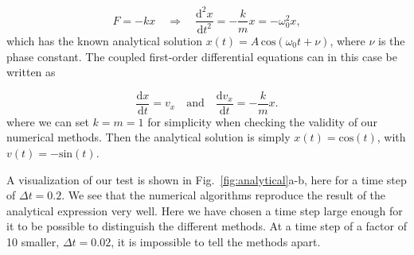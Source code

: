 \documentclass{article}
\begin{document}
\begin{multicols}{2}
\begin{equation}
	F = -kx \quad \Rightarrow \quad \frac{\mathrm{d}^2 x}{\mathrm{d}t^2} = - \frac{k}{m}x = - \omega_0^2 x,
\end{equation}
which has the known analytical solution $x(t) = A \, \mathrm{cos}(\omega_0 t + \nu)$, where $\nu$ is the phase constant. The coupled first-order differential equations can in this case be written as

\begin{equation}
	\frac{\mathrm{d}x}{\mathrm{d}t} = v_x  \quad \mathrm{and} \quad \frac{\mathrm{d}v_x}{\mathrm{d}t} = - \frac{k}{m} x.
\end{equation}
where we can set $k = m = 1$ for simplicity when checking the validity of our numerical methods. Then the analytical solution is simply $x(t) = \mathrm{cos}(t)$, with $v(t) = - \mathrm{sin}(t)$.

A visualization of our test is shown in Fig.~\ref{fig:analytical}a-b, here for a time step of $\Delta t = 0.2$. We see that the numerical algorithms reproduce the result of the analytical expression very well. Here we have chosen a time step large enough for it to be possible to distinguish the different methods. At a time step of a factor of 10 smaller, $\Delta t = 0.02$, it is impossible to tell the methods apart. \\


\end{multicols}
\end{document}
